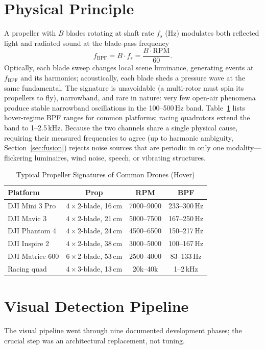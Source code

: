 \documentclass[conference]{IEEEtran}
\begin{document}
\section{Physical Principle}
\label{sec:principle}
A propeller with $B$ blades rotating at shaft rate $f_s$ (Hz) modulates
both reflected light and radiated sound at the blade-pass frequency
\begin{equation}
f_{\mathrm{BPF}} = B \cdot f_s = \frac{B \cdot \mathrm{RPM}}{60}.
\label{eq:bpf}
\end{equation}
Optically, each blade sweep changes local scene luminance, generating
events at $f_{\mathrm{BPF}}$ and its harmonics; acoustically, each blade
sheds a pressure wave at the same fundamental. The signature is
unavoidable (a multi-rotor must spin its propellers to fly), narrowband,
and rare in nature: very few open-air phenomena produce stable narrowband
oscillations in the 100--500\,Hz band. Table~\ref{tab:dronebpf} lists
hover-regime BPF ranges for common platforms; racing quadrotors extend
the band to 1--2.5\,kHz. Because the two channels share a single physical
cause, requiring their measured frequencies to agree (up to harmonic
ambiguity, Section~\ref{sec:fusion}) rejects noise sources that are
periodic in only one modality---flickering luminaires, wind noise,
speech, or vibrating structures.

\begin{table}[t]
\caption{Typical Propeller Signatures of Common Drones (Hover)}
\label{tab:dronebpf}
\centering
\begin{tabular}{@{}lccc@{}}
\toprule
\textbf{Platform} & \textbf{Prop} & \textbf{RPM} & \textbf{BPF} \\
\midrule
DJI Mini 3 Pro & $4\times$2-blade, 16\,cm & 7000--9000 & 233--300\,Hz \\
DJI Mavic 3 & $4\times$2-blade, 21\,cm & 5000--7500 & 167--250\,Hz \\
DJI Phantom 4 & $4\times$2-blade, 24\,cm & 4500--6500 & 150--217\,Hz \\
DJI Inspire 2 & $4\times$2-blade, 38\,cm & 3000--5000 & 100--167\,Hz \\
DJI Matrice 600 & $6\times$2-blade, 53\,cm & 2500--4000 & 83--133\,Hz \\
Racing quad & $4\times$3-blade, 13\,cm & 20k--40k & 1--2\,kHz \\
\bottomrule
\end{tabular}
\end{table}

\section{Visual Detection Pipeline}
\label{sec:visual}
The visual pipeline went through nine documented development phases; the
crucial step was an architectural replacement, not tuning.
\end{document}
